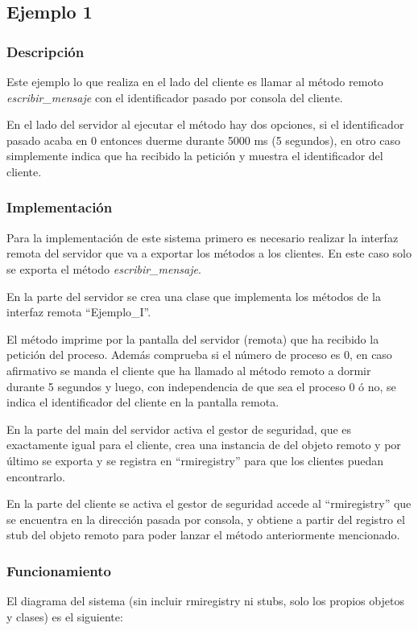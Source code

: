 \documentclass{article}
\begin{document}
\subsection{Ejemplo 1}
\subsubsection{Descripción}
Este ejemplo lo que realiza en el lado del cliente es llamar al método remoto \textit{escribir\_mensaje} con el identificador pasado por consola del cliente.

En el lado del servidor al ejecutar el método hay dos opciones, si el identificador pasado acaba en 0 entonces duerme durante 5000 ms (5 segundos), en otro caso simplemente indica que ha recibido la petición y muestra el identificador del cliente.




\subsubsection{Implementación}
Para la implementación de este sistema primero es necesario realizar la interfaz remota del servidor que va a exportar los métodos a los clientes. En este caso solo se exporta el método \textit{escribir\_mensaje}.

En la parte del servidor se crea una clase que implementa los métodos de la interfaz remota ``Ejemplo\_I''.

El método imprime por la pantalla del servidor (remota) que ha recibido la petición del proceso. Además comprueba si el número de proceso es 0, en caso afirmativo se manda el cliente que ha llamado al método remoto a dormir durante 5 segundos y luego, con independencia de que sea el proceso 0 ó no, se indica el identificador del cliente en la pantalla remota.

En la parte del main del servidor activa el gestor de seguridad, que es exactamente igual para el cliente, crea una instancia de del objeto remoto y por último se exporta y se registra en ``rmiregistry'' para que los clientes puedan encontrarlo.

En la parte del cliente se activa el gestor de seguridad accede al ``rmiregistry'' que se encuentra en la dirección pasada por consola, y obtiene a partir del registro el stub del objeto remoto para poder lanzar el método anteriormente mencionado.


\subsubsection{Funcionamiento}
El diagrama del sistema (sin incluir rmiregistry ni stubs, solo los propios objetos y clases) es el siguiente:
\end{document}
